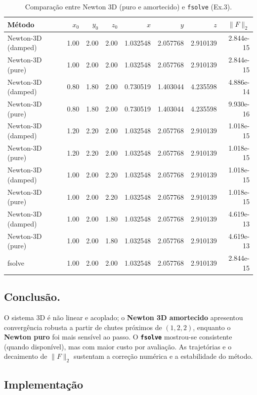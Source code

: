 \documentclass[12pt,a4paper]{article}
\begin{document}
\begin{table}[H]
\centering
\caption{Comparação entre Newton 3D (puro e amortecido) e \texttt{fsolve} (Ex.3).}
\label{tab:ex3_methods}
\begin{tabular}{l r r r r r r r}
\hline
Método & $x_0$ & $y_0$ & $z_0$ & $x$ & $y$ & $z$ & $\|F\|_2$ \\
\hline
Newton-3D (damped) & 1.00 & 2.00 & 2.00 & 1.032548 & 2.057768 & 2.910139 & 2.844e-15 \\
Newton-3D (pure) & 1.00 & 2.00 & 2.00 & 1.032548 & 2.057768 & 2.910139 & 2.844e-15 \\
Newton-3D (damped) & 0.80 & 1.80 & 2.00 & 0.730519 & 1.403044 & 4.235598 & 4.886e-14 \\
Newton-3D (pure) & 0.80 & 1.80 & 2.00 & 0.730519 & 1.403044 & 4.235598 & 9.930e-16 \\
Newton-3D (damped) & 1.20 & 2.20 & 2.00 & 1.032548 & 2.057768 & 2.910139 & 1.018e-15 \\
Newton-3D (pure) & 1.20 & 2.20 & 2.00 & 1.032548 & 2.057768 & 2.910139 & 1.018e-15 \\
Newton-3D (damped) & 1.00 & 2.00 & 2.20 & 1.032548 & 2.057768 & 2.910139 & 1.018e-15 \\
Newton-3D (pure) & 1.00 & 2.00 & 2.20 & 1.032548 & 2.057768 & 2.910139 & 1.018e-15 \\
Newton-3D (damped) & 1.00 & 2.00 & 1.80 & 1.032548 & 2.057768 & 2.910139 & 4.619e-13 \\
Newton-3D (pure) & 1.00 & 2.00 & 1.80 & 1.032548 & 2.057768 & 2.910139 & 4.619e-13 \\
fsolve & 1.00 & 2.00 & 2.00 & 1.032548 & 2.057768 & 2.910139 & 2.844e-15 \\
\hline
\end{tabular}
\end{table}

\subsection{Conclusão.}
O sistema 3D é não linear e acoplado; o \textbf{Newton 3D amortecido} apresentou convergência robusta a partir de chutes próximos de $(1,2,2)$, enquanto o \textbf{Newton puro} foi mais sensível ao passo. O \textbf{\texttt{fsolve}} mostrou-se consistente (quando disponível), mas com maior custo por avaliação. As trajetórias e o decaimento de $\|F\|_2$ sustentam a correção numérica e a estabilidade do método.

\subsection{Implementação}
\label{subsec:ex3-implementacao}
\end{document}
